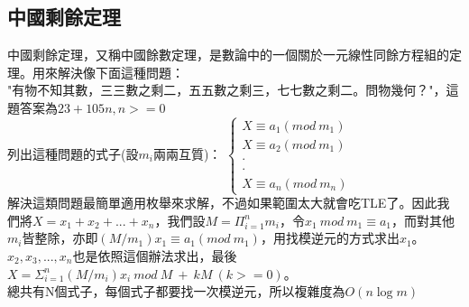 \subsection{中國剩餘定理}
中國剩餘定理，又稱中國餘數定理，是數論中的一個關於一元線性同餘方程組的定理。用來解決像下面這種問題：\\
"有物不知其數，三三數之剩二，五五數之剩三，七七數之剩二。問物幾何？"，這題答案為$23+105n,n>=0$\\
列出這種問題的式子(設$m_i$兩兩互質)：
$\left \{ \begin{matrix} X\equiv a_1 (mod\ m_1)\\ X\equiv a_2 (mod\ m_1)\\ \cdot \\ \cdot \\ X\equiv a_n (mod\ m_n)\end{matrix}\right.$\\
解決這類問題最簡單適用枚舉來求解，不過如果範圍太大就會吃TLE了。因此我們將$X=x_1+x_2+...+x_n$，我們設$M=\Pi_{i=1}^{n} m_i$，令$x_1\ mod\ m_1\equiv a_1$，而對其他$m_i$皆整除，亦即$(M/m_1)x_1\equiv a_1 (mod\ m_1)$，用找模逆元的方式求出$x_1$。$x_2,x_3,...,x_n$也是依照這個辦法求出，最後$X=\Sigma_{i=1}^{n} (M/m_i)x_i\ mod\ M\ +\ kM\ (k>=0)$。\\
總共有N個式子，每個式子都要找一次模逆元，所以複雜度為$O(n \log m)$